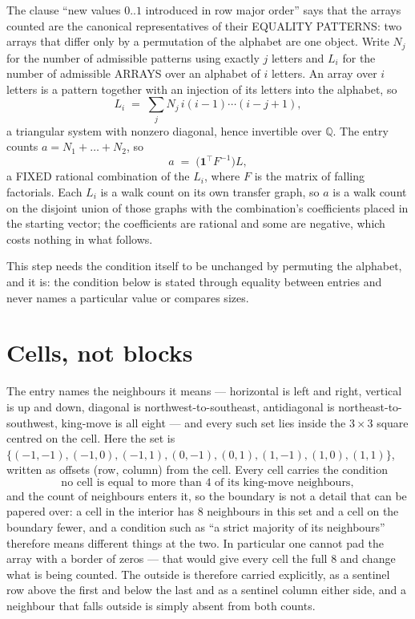 \documentclass[11pt,a4paper]{article}
\theoremstyle{plain}
\theoremstyle{definition}
\begin{document}
The clause ``new values $0..1$ introduced in row major order'' says that the arrays
counted are the canonical representatives of their EQUALITY PATTERNS: two arrays that differ
only by a permutation of the alphabet are one object. Write $N_j$ for the number of admissible
patterns using exactly $j$ letters and $L_i$ for the number of admissible ARRAYS over an
alphabet of $i$ letters. An array over $i$ letters is a pattern together with an injection of
its letters into the alphabet, so
\[
L_i\;=\;\sum_{j}N_j\,i(i-1)\cdots(i-j+1),
\]
a triangular system with nonzero diagonal, hence invertible over $\mathbb{Q}$. The entry
counts $a=N_1+\dots+N_{2}$, so
\[
a\;=\;\bigl(\mathbf{1}^{\!\top}F^{-1}\bigr)L ,
\]
a FIXED rational combination of the $L_i$, where $F$ is the matrix of falling factorials.
Each $L_i$ is a walk count on its own transfer graph, so $a$ is a walk count on the disjoint
union of those graphs with the combination's coefficients placed in the starting vector; the
coefficients are rational and some are negative, which costs nothing in what follows.

This step needs the condition itself to be unchanged by permuting the alphabet, and it is:
the condition below is stated through equality between entries and never names a particular
value or compares sizes.

\section{Cells, not blocks}

The entry names the neighbours it means --- horizontal is left and right, vertical is up and
down, diagonal is northwest-to-southeast, antidiagonal is northeast-to-southwest, king-move is
all eight --- and every such set lies inside the $3\times3$ square centred on the cell. Here
the set is $\{(-1,-1), (-1,0), (-1,1), (0,-1), (0,1), (1,-1), (1,0), (1,1)\}$, written as offsets (row, column) from the cell. Every cell carries
the condition
\[
\text{no cell is equal to more than 4 of its king-move neighbours},
\]
and the count of neighbours enters it, so the boundary is not a detail that can be papered
over: a cell in the interior has $8$ neighbours in this set and a cell on the boundary
fewer, and a condition such as ``a strict majority of its neighbours'' therefore means
different things at the two. In particular one cannot pad the array with a border of zeros ---
that would give every cell the full $8$ and change what is being counted. The outside is
therefore carried
explicitly, as a sentinel row above the first and below the last and as a sentinel column
either side, and a neighbour that falls outside is simply absent from both counts.
\end{document}
